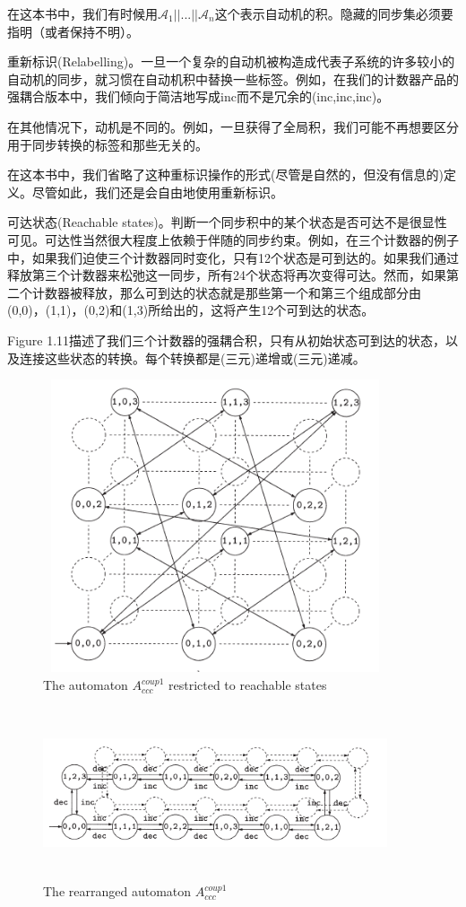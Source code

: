 \documentclass{book}
\begin{document}
    在这本书中，我们有时候用$\mathcal{A}_1||...||\mathcal{A}_n$这个表示自动机的积。隐藏的同步集必须要指明（或者保持不明）。
    
    重新标识(Relabelling)。一旦一个复杂的自动机被构造成代表子系统的许多较小的自动机的同步，就习惯在自动机积中替换一些标签。例如，在我们的计数器产品的强耦合版本中，我们倾向于简洁地写成inc而不是冗余的(inc,inc,inc)。
    
    在其他情况下，动机是不同的。例如，一旦获得了全局积，我们可能不再想要区分用于同步转换的标签和那些无关的。
    
    在这本书中，我们省略了这种重标识操作的形式(尽管是自然的，但没有信息的)定义。尽管如此，我们还是会自由地使用重新标识。
    
    可达状态(Reachable states)。判断一个同步积中的某个状态是否可达不是很显性可见。可达性当然很大程度上依赖于伴随的同步约束。例如，在三个计数器的例子中，如果我们迫使三个计数器同时变化，只有12个状态是可到达的。如果我们通过释放第三个计数器来松弛这一同步，所有24个状态将再次变得可达。然而，如果第二个计数器被释放，那么可到达的状态就是那些第一个和第三个组成部分由(0,0)，(1,1)，(0,2)和(1,3)所给出的，这将产生12个可到达的状态。
    
    Figure 1.11描述了我们三个计数器的强耦合积，只有从初始状态可到达的状态，以及连接这些状态的转换。每个转换都是(三元)递增或(三元)递减。
    \begin{figure}
    \centering
    \includegraphics[height=3.4in,width=4.0in]{1_11.png}
    \caption{The automaton $A_{ccc}^{coup1}$ restricted to reachable states}
    \end{figure}
    \begin{figure}
    \centering
    \includegraphics[height=2.0in,width=4.0in]{1_12.png}
    \caption{The rearranged automaton $A_{ccc}^{coup1}$}
    \end{figure}
    
\end{document}
